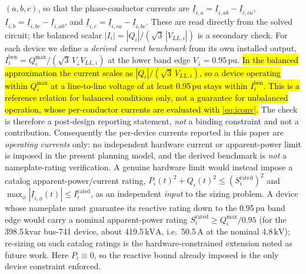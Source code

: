 \documentclass{ieeeaccess}
\newcommand{\rev}[1]{{\color{red}\hl{#1}}}
\newcommand{\rev}[1]{#1}
\newcommand{\SI}[2]{#1\,\ensuremath{\mathrm{#2}}}
\newcommand{\Qmax}{Q^{\max}}
\newcommand{\Iben}{I^{\mathrm{ben}}}
\begin{document}
$(a,b,c)$, so that the phase-conductor currents are
$\underline I_{i,a}=\underline I_{i,ab}-\underline I_{i,ca}$,
$\underline I_{i,b}=\underline I_{i,bc}-\underline I_{i,ab}$, and
$\underline I_{i,c}=\underline I_{i,ca}-\underline I_{i,bc}$. These
are read directly from the solved circuit; the balanced scalar
$|I_i|=|Q_i|/(\sqrt3\,|V_{LL,i}|)$ is a secondary check. For each device we define a
\emph{derived current benchmark} from its own installed output,
$\Iben_i=\Qmax_i/(\sqrt3\,V_{\!\downarrow}V_{LL,i})$ at the lower band edge
$V_{\!\downarrow}=\SI{0.95}{pu}$. \rev{In the balanced approximation the current scales as
\mbox{$|Q_i|/(\sqrt3\,V_{LL,i})$}, so a device operating within \mbox{$\Qmax_i$} at a
line-to-line voltage of at least \mbox{\SI{0.95}{pu}} stays within \mbox{$\Iben_i$}. This
is a reference relation for balanced conditions only, not a guarantee for unbalanced
operation, whose per-conductor currents are evaluated with \mbox{\eqref{eq:iconv}}.} The
check is therefore a post-design reporting statement, \emph{not} a binding constraint
and not a contribution. Consequently the
per-device currents reported in this paper are \emph{operating currents} only: no
independent hardware current or apparent-power limit is imposed in the present
planning model, and the derived benchmark is \emph{not} a nameplate-rating
verification. A genuine hardware limit would instead impose a catalog
apparent-power/current rating,
$P_i(t)^2+Q_i(t)^2\le (S_i^{\mathrm{rated}})^2$ and
$\max_\phi|\underline I_{i,\phi}(t)|\le I_i^{\mathrm{rated}}$, as an independent
\emph{input} to the sizing problem. A device whose nameplate must guarantee its
reactive rating down to the \SI{0.95}{pu} band edge would carry a nominal
apparent-power rating $S_i^{\mathrm{rated}}\ge\Qmax_i/0.95$ (for the \SI{398.5}{kvar}
bus-741 device, about \SI{419.5}{kVA}, i.e.\ \SI{50.5}{A} at the nominal
\SI{4.8}{kV}); re-sizing on such catalog ratings is the hardware-constrained
extension noted as future work. Here $P_i\equiv0$, so the reactive bound already
imposed is the only device constraint enforced.
\end{document}
